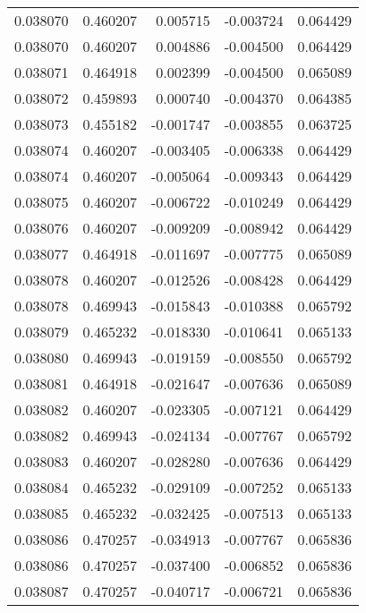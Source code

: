 \begin{tabular}{lrrrr}
0.038070    &  0.460207 &  0.005715 & -0.003724 &             0.064429 \\
0.038070    &  0.460207 &  0.004886 & -0.004500 &             0.064429 \\
0.038071    &  0.464918 &  0.002399 & -0.004500 &             0.065089 \\
0.038072    &  0.459893 &  0.000740 & -0.004370 &             0.064385 \\
0.038073    &  0.455182 & -0.001747 & -0.003855 &             0.063725 \\
0.038074    &  0.460207 & -0.003405 & -0.006338 &             0.064429 \\
0.038074    &  0.460207 & -0.005064 & -0.009343 &             0.064429 \\
0.038075    &  0.460207 & -0.006722 & -0.010249 &             0.064429 \\
0.038076    &  0.460207 & -0.009209 & -0.008942 &             0.064429 \\
0.038077    &  0.464918 & -0.011697 & -0.007775 &             0.065089 \\
0.038078    &  0.460207 & -0.012526 & -0.008428 &             0.064429 \\
0.038078    &  0.469943 & -0.015843 & -0.010388 &             0.065792 \\
0.038079    &  0.465232 & -0.018330 & -0.010641 &             0.065133 \\
0.038080    &  0.469943 & -0.019159 & -0.008550 &             0.065792 \\
0.038081    &  0.464918 & -0.021647 & -0.007636 &             0.065089 \\
0.038082    &  0.460207 & -0.023305 & -0.007121 &             0.064429 \\
0.038082    &  0.469943 & -0.024134 & -0.007767 &             0.065792 \\
0.038083    &  0.460207 & -0.028280 & -0.007636 &             0.064429 \\
0.038084    &  0.465232 & -0.029109 & -0.007252 &             0.065133 \\
0.038085    &  0.465232 & -0.032425 & -0.007513 &             0.065133 \\
0.038086    &  0.470257 & -0.034913 & -0.007767 &             0.065836 \\
0.038086    &  0.470257 & -0.037400 & -0.006852 &             0.065836 \\
0.038087    &  0.470257 & -0.040717 & -0.006721 &             0.065836 \\

\end{tabular}
